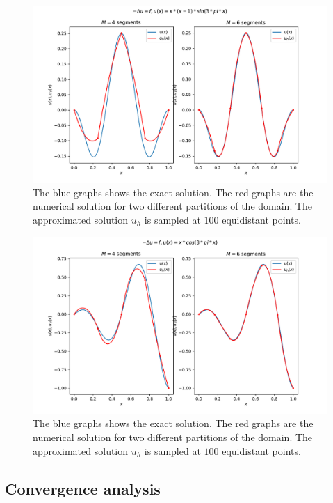 \begin{figure}
  \centering
  \includegraphics[width=\textwidth]{Images/plots/task1_test_sol1.pdf}
  \caption{The blue graphs shows the exact solution.
  The red graphs are the numerical solution for two
different partitions of the domain.
The approximated solution \( u_h \) is sampled at \( 100 \)
equidistant points.}
  \label{fig:test_eq1}
\end{figure}

\begin{figure}
  \centering
  \includegraphics[width=\textwidth]{Images/plots/task1_test_sol2.pdf}
  \caption{The blue graphs shows the exact solution.
  The red graphs are the numerical solution for two
different partitions of the domain.
The approximated solution \( u_h \) is sampled at \( 100 \)
equidistant points.}
  \label{fig:test_eq2}
\end{figure}

\subsection{Convergence analysis}

